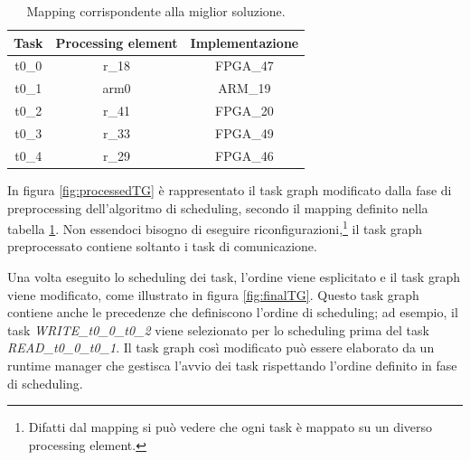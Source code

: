 \begin{table}[tb]
 \begin{center}
  \begin{tabular}{|c|c|c|}
   \hline
   \textbf{Task} & \textbf{Processing element} & \textbf{Implementazione}\\
   \hline
   t0\_0 & r\_18 & FPGA\_47\\
   \hline
   t0\_1 & arm0 & ARM\_19\\
   \hline
   t0\_2 & r\_41 & FPGA\_20\\
   \hline
   t0\_3 & r\_33 & FPGA\_49\\
   \hline
   t0\_4 & r\_29 & FPGA\_46\\
   \hline
  \end{tabular}
  \caption{Mapping corrispondente alla miglior soluzione.}
  \label{tab:bestMapping}
 \end{center}
\end{table}

In figura \ref{fig:processedTG} \`e rappresentato il task graph modificato dalla fase
di preprocessing dell'algoritmo di scheduling, secondo il mapping definito nella tabella
\ref{tab:bestMapping}. Non essendoci bisogno di eseguire riconfigurazioni,\footnote{Difatti
dal mapping si pu\`o vedere che ogni task \`e mappato su un diverso processing element.}
il task graph preprocessato contiene soltanto i task di comunicazione.

Una volta eseguito lo scheduling dei task, l'ordine viene esplicitato
e il task graph viene modificato, come illustrato in figura \ref{fig:finalTG}.
Questo task graph contiene anche le precedenze che definiscono l'ordine di scheduling;
ad esempio, il task \emph{WRITE\_t0\_0\_t0\_2} viene selezionato per lo scheduling prima del task
\emph{READ\_t0\_0\_t0\_1}. Il task graph cos\`i modificato pu\`o essere elaborato da un runtime
manager che gestisca l'avvio dei task rispettando l'ordine definito in fase di scheduling.

